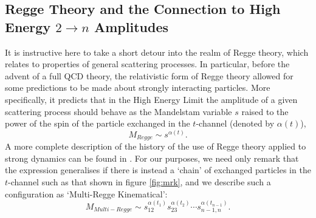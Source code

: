 \subsection{Regge Theory and the Connection to High Energy $2 \to n$ Amplitudes} 

It is instructive here to take a short detour into the realm of Regge theory, which relates to properties of general scattering processes. In particular, before the advent of a full QCD theory, the relativistic form of Regge theory allowed for some predictions to be made about strongly interacting particles. More specifically, it predicts that in the High Energy Limit the amplitude of a given scattering process should behave as the Mandelstam variable $s$ raised to the power of the spin of the particle exchanged in the $t$-channel (denoted by $\alpha(t)$),
\begin{equation}
M_{Regge} \sim s^{\alpha(t)}.
\end{equation}
A more complete description of the history of the use of Regge theory applied to strong dynamics can be found in \cite{pomeronbook}. For our purposes, we need only remark that the expression generalises if there is instead a `chain' of exchanged particles in the $t$-channel such as that shown in figure \ref{fig:mrk}, and we describe such a configuration as `Multi-Regge Kinematical': 
\begin{equation}
M_{Multi-Regge} \sim s_{12}^{\alpha(t_1)} s_{23}^{\alpha(t_2)} \cdots s_{n-1,n}^{\alpha(t_{n-1})}.
\end{equation}
